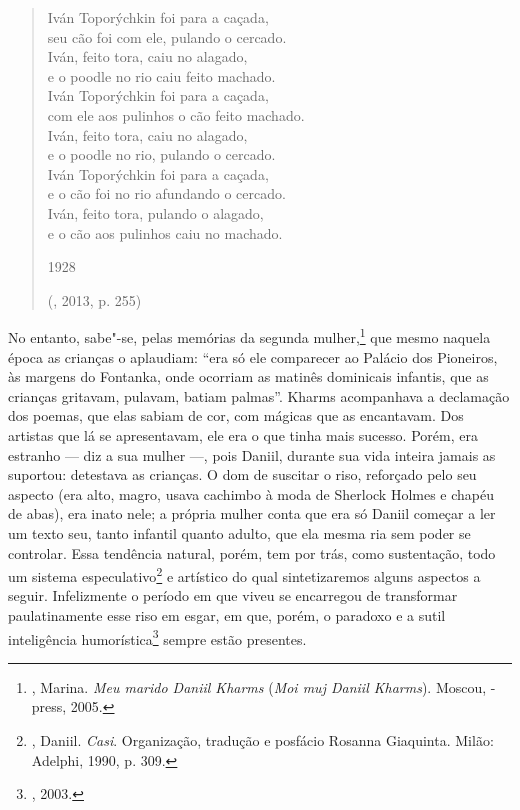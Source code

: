 \begin{verse} 
Iván Toporýchkin foi para a caçada,\\
seu cão foi com ele, pulando o cercado.\\
Iván, feito tora, caiu no alagado,\\
e o poodle no rio caiu feito machado.\\[8pt]
Iván Toporýchkin foi para a caçada,\\
com ele aos pulinhos o cão feito machado.\\
Iván, feito tora, caiu no alagado,\\
e o poodle no rio, pulando o cercado.\\[8pt]
Iván Toporýchkin foi para a caçada,\\
e o cão foi no rio afundando o cercado.\\
Iván, feito tora, pulando o alagado,\\
e o cão aos pulinhos caiu no machado.

1928

(, 2013, p. 255)
\end{verse}

No entanto, sabe"-se, pelas memórias da segunda mulher,\footnote{, Marina. \emph{Meu marido Daniil Kharms} (\emph{Moi muj Daniil Kharms}). Moscou, -press, 2005.} que mesmo naquela época as crianças o aplaudiam: ``era só ele comparecer ao Palácio dos Pioneiros, às margens do Fontanka, onde ocorriam as matinês dominicais infantis, que as crianças gritavam, pulavam, batiam palmas''. Kharms acompanhava a declamação dos poemas, que elas sabiam de cor, com mágicas que as encantavam. Dos artistas que lá se apresentavam, ele era o que tinha mais sucesso. Porém, era estranho --- diz a sua mulher ---, pois Daniil, durante sua vida inteira jamais as suportou: detestava as crianças. O dom de suscitar o riso, reforçado pelo seu aspecto (era alto, magro, usava cachimbo à moda de Sherlock Holmes e chapéu de abas), era inato nele; a própria mulher conta que era só Daniil começar a ler um texto seu, tanto infantil quanto adulto, que ela mesma ria sem poder se controlar. Essa tendência natural, porém, tem por trás, como sustentação, todo um sistema especulativo\footnote{, Daniil. \emph{Casi}. Organização, tradução e posfácio Rosanna Giaquinta. Milão: Adelphi, 1990, p. 309.} e artístico do qual sintetizaremos alguns aspectos a seguir. Infelizmente o período em que viveu se encarregou de transformar paulatinamente esse riso em esgar, em que, porém, o paradoxo e a sutil inteligência humorística\footnote{, 2003.} sempre estão presentes.

